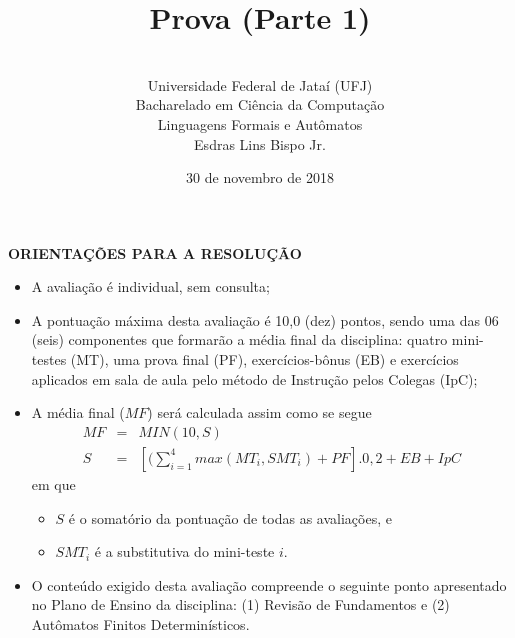 \documentclass[12pt,a4paper,oneside]{article}
\author{\\Universidade Federal de Jataí (UFJ)\\Bacharelado em Ciência da Computação \\Linguagens Formais e Autômatos \\Esdras Lins Bispo Jr.}
\date{30 de novembro de 2018}
\title{\sc \huge Prova (Parte 1)}
\begin{document}
\maketitle

{\bf ORIENTAÇÕES PARA A RESOLUÇÃO}

\small
 
\begin{itemize}
	\item A avaliação é individual, sem consulta;
	\item A pontuação máxima desta avaliação é 10,0 (dez) pontos, sendo uma das 06 (seis) componentes que formarão a média final da disciplina: quatro mini-testes (MT), uma prova final (PF), exercícios-bônus (EB) e exercícios aplicados em sala de aula pelo método de Instrução pelos Colegas (IpC);
	\item A média final ($MF$) será calculada assim como se segue
	\begin{eqnarray}
		MF & = & MIN(10, S) \nonumber \\
		S & = & [(\sum_{i=1}^{4} max(MT_i, SMT_i ) + PF].0,2  + EB + IpC\nonumber
	\end{eqnarray}
	em que 
	\begin{itemize}
		\item $S$ é o somatório da pontuação de todas as avaliações, e
		\item $SMT_i$ é a substitutiva do mini-teste $i$.
	\end{itemize}
	\item O conteúdo exigido desta avaliação compreende o seguinte ponto apresentado no Plano de Ensino da disciplina: (1) Revisão de Fundamentos e (2) Autômatos Finitos Determinísticos.
\end{itemize}

\begin{center}
\end{center}

\newpage
\end{document}
